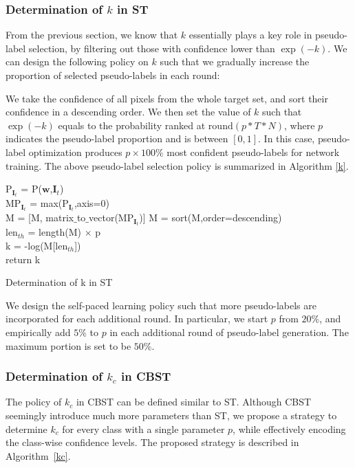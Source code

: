 \documentclass[runningheads]{llncs}
\begin{document}
\subsubsection{Determination of $k$ in ST} \label{plg_st_1}
From the previous section, we know that $k$ essentially plays a key role in pseudo-label selection, by filtering out those with confidence lower than $\exp(-k)$. We can design the following policy on $k$ such that we gradually increase the proportion of selected pseudo-labels in each round:

We take the confidence of all pixels from the whole target set, and sort their confidence in a descending order. We then set the value of $k$ such that $\exp(-k)$ equals to the probability ranked at $\mathrm{round}(p*T*N)$, where $p$ indicates the pseudo-label proportion and is between $[0, 1]$. In this case, pseudo-label optimization produces $p\times100\%$ most confident pseudo-labels for network training. The above pseudo-label selection policy is summarized in Algorithm \ref{k}.

\begin{algorithm}

     { P$_{\textbf{I}_t}$ = P($\textbf{w}$,$\textbf{I}_t$) \\
        MP$_{\textbf{I}_t}$ = max(P$_{\textbf{I}_t}$,axis=0) \\
     M = [M, matrix$\_$to$\_$vector(MP$_{\textbf{I}_t}$)]
     }
     {
     M = sort(M,order=descending)\\
     len$_{th}$ = length(M) $\times$ p \\
     k = -log(M[len$_{th}$]) \\
     return k
     }
    \caption{Determination of k in ST}
    \label{k}
\end{algorithm}

We design the self-paced learning policy such that more pseudo-labels are incorporated for each additional round. In particular, we start $p$ from $20\%$, and empirically add $5\%$ to $p$ in each additional round of pseudo-label generation. The maximum portion is set to be $50\%$.

\subsubsection{Determination of $k_c$ in CBST} \label{plg_cbst_1}
The policy of $k_c$ in CBST can be defined similar to ST. Although CBST seemingly introduce much more parameters than ST, we propose a strategy to determine $k_c$ for every class with a single parameter $p$, while effectively encoding the class-wise confidence levels. The proposed strategy is described in Algorithm~\ref{kc}.
\end{document}
